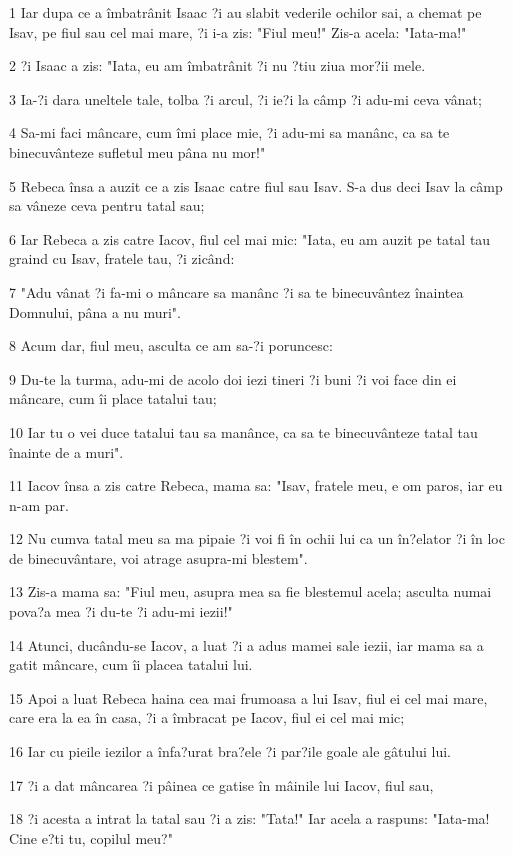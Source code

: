 \par 1 Iar dupa ce a îmbatrânit Isaac ?i au slabit vederile ochilor sai, a chemat pe Isav, pe fiul sau cel mai mare, ?i i-a zis: "Fiul meu!" Zis-a acela: "Iata-ma!"
\par 2 ?i Isaac a zis: "Iata, eu am îmbatrânit ?i nu ?tiu ziua mor?ii mele.
\par 3 Ia-?i dara uneltele tale, tolba ?i arcul, ?i ie?i la câmp ?i adu-mi ceva vânat;
\par 4 Sa-mi faci mâncare, cum îmi place mie, ?i adu-mi sa manânc, ca sa te binecuvânteze sufletul meu pâna nu mor!"
\par 5 Rebeca însa a auzit ce a zis Isaac catre fiul sau Isav. S-a dus deci Isav la câmp sa vâneze ceva pentru tatal sau;
\par 6 Iar Rebeca a zis catre Iacov, fiul cel mai mic: "Iata, eu am auzit pe tatal tau graind cu Isav, fratele tau, ?i zicând:
\par 7 "Adu vânat ?i fa-mi o mâncare sa manânc ?i sa te binecuvântez înaintea Domnului, pâna a nu muri".
\par 8 Acum dar, fiul meu, asculta ce am sa-?i poruncesc:
\par 9 Du-te la turma, adu-mi de acolo doi iezi tineri ?i buni ?i voi face din ei mâncare, cum îi place tatalui tau;
\par 10 Iar tu o vei duce tatalui tau sa manânce, ca sa te binecuvânteze tatal tau înainte de a muri".
\par 11 Iacov însa a zis catre Rebeca, mama sa: "Isav, fratele meu, e om paros, iar eu n-am par.
\par 12 Nu cumva tatal meu sa ma pipaie ?i voi fi în ochii lui ca un în?elator ?i în loc de binecuvântare, voi atrage asupra-mi blestem".
\par 13 Zis-a mama sa: "Fiul meu, asupra mea sa fie blestemul acela; asculta numai pova?a mea ?i du-te ?i adu-mi iezii!"
\par 14 Atunci, ducându-se Iacov, a luat ?i a adus mamei sale iezii, iar mama sa a gatit mâncare, cum îi placea tatalui lui.
\par 15 Apoi a luat Rebeca haina cea mai frumoasa a lui Isav, fiul ei cel mai mare, care era la ea în casa, ?i a îmbracat pe Iacov, fiul ei cel mai mic;
\par 16 Iar cu pieile iezilor a înfa?urat bra?ele ?i par?ile goale ale gâtului lui.
\par 17 ?i a dat mâncarea ?i pâinea ce gatise în mâinile lui Iacov, fiul sau,
\par 18 ?i acesta a intrat la tatal sau ?i a zis: "Tata!" Iar acela a raspuns: "Iata-ma! Cine e?ti tu, copilul meu?"
